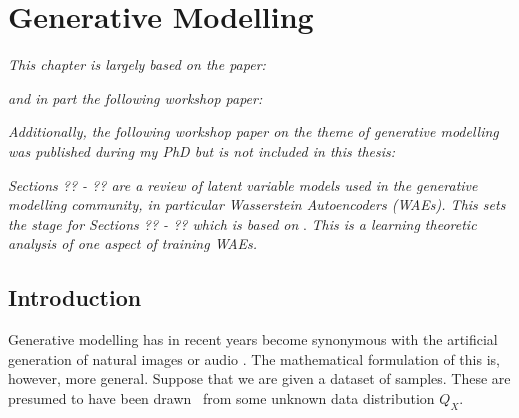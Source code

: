 \chapter{Generative Modelling}

\ifpdf
    \graphicspath{{Chapter5/Figs/Raster/}{Chapter5/Figs/PDF/}{Chapter5/Figs/}}
\else
    \graphicspath{{Chapter5/Figs/Vector/}{Chapter5/Figs/}}
\fi

\emph{This chapter is largely based on the paper:}

\begin{quote}
\end{quote}

\emph{and in part the following workshop paper:}

\begin{quote}
\end{quote}


\emph{Additionally, the following workshop paper on the theme of generative modelling was published during my PhD but is not included in this thesis:}

\begin{quote}
\end{quote}

\emph{Sections ?? - ?? are a review of latent variable models used in the generative modelling community, in particular Wasserstein Autoencoders (WAEs). 
This sets the stage for Sections ?? - ?? which is based on} \cite{rubenstein2019practical}.
\emph{This is a learning theoretic analysis of one aspect of training WAEs.}


\section{Introduction}

Generative modelling has in recent years become synonymous with the artificial generation of natural images or audio \cite{something_for_images, wavenet?}.
The mathematical formulation of this is, however, more general.
Suppose that we are given a dataset of samples. 
These are presumed to have been drawn \iid~from some unknown data distribution $Q_X$.


